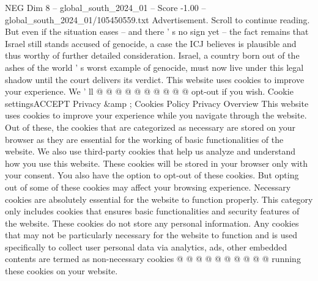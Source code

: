 \begin{textsample}{NEG Dim 8 – global\_south\_2024\_01 – Score -1.00 – global\_south\_2024\_01/105450559.txt}
Advertisement.
Scroll to continue reading.
But even if the situation eases -- and there ' s no sign yet -- the fact remains that Israel still stands accused of genocide, a case the ICJ believes is plausible and thus worthy of further detailed consideration.
Israel, a country born out of the ashes of the world ' s worst example of genocide, must now live under this legal shadow until the court delivers its verdict.
This website uses cookies to improve your experience.
We ' ll @ @ @ @ @ @ @ @ @ @ opt-out if you wish.
Cookie settingsACCEPT Privacy \&amp ; Cookies Policy Privacy Overview This website uses cookies to improve your experience while you navigate through the website.
Out of these, the cookies that are categorized as necessary are stored on your browser as they are essential for the working of basic functionalities of the website.
We also use third-party cookies that help us analyze and understand how you use this website.
These cookies will be stored in your browser only with your consent.
You also have the option to opt-out of these cookies.
But opting out of some of these cookies may affect your browsing experience.
Necessary cookies are absolutely essential for the website to function properly.
This category only includes cookies that ensures basic functionalities and security features of the website.
These cookies do not store any personal information.
Any cookies that may not be particularly necessary for the website to function and is used specifically to collect user personal data via analytics, ads, other embedded contents are termed as non-necessary cookies @ @ @ @ @ @ @ @ @ @ running these cookies on your website.

\end{textsample}
